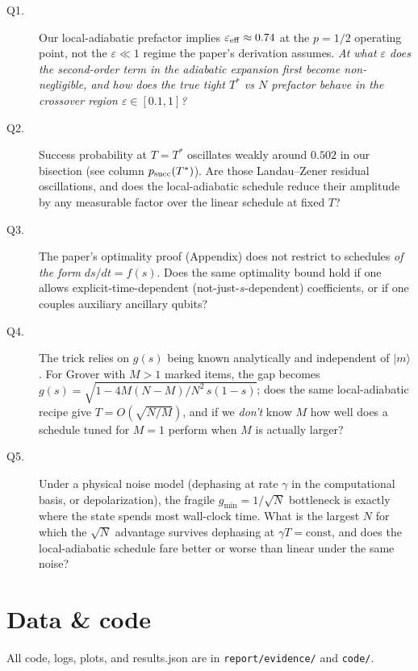 \documentclass[11pt]{article}
\begin{document}
\begin{description}
\item[Q1.] Our local-adiabatic prefactor implies
      $\varepsilon_{\rm eff}\approx 0.74$ at the $p=1/2$ operating point,
      not the $\varepsilon\ll 1$ regime the paper's derivation assumes.
      \emph{At what $\varepsilon$ does the second-order term in the adiabatic
      expansion first become non-negligible, and how does the true tight $T^*$
      vs $N$ prefactor behave in the crossover region $\varepsilon\in[0.1,1]$?}
\item[Q2.] Success probability at $T=T^*$ oscillates weakly around $0.502$ in
      our bisection (see column $p_{\rm succ}(T^{\ast})$). Are those Landau--Zener
      residual oscillations, and does the local-adiabatic schedule reduce their
      amplitude by any measurable factor over the linear schedule at fixed $T$?
\item[Q3.] The paper's optimality proof (Appendix) does not restrict to schedules
      \emph{of the form} $ds/dt=f(s)$. Does the same optimality bound hold if
      one allows explicit-time-dependent (not-just-$s$-dependent) coefficients,
      or if one couples auxiliary ancillary qubits?
\item[Q4.] The trick relies on $g(s)$ being known analytically and independent
      of $|m\rangle$. For Grover with $M>1$ marked items, the gap becomes
      $g(s)=\sqrt{1-4M(N-M)/N^2\,s(1-s)}$; does the same local-adiabatic
      recipe give $T=O(\sqrt{N/M})$, and if we \emph{don't} know $M$ how well
      does a schedule tuned for $M=1$ perform when $M$ is actually larger?
\item[Q5.] Under a physical noise model (dephasing at rate $\gamma$ in
      the computational basis, or depolarization), the fragile $g_{\min}=1/\sqrt N$
      bottleneck is exactly where the state spends most wall-clock time.
      What is the largest $N$ for which the $\sqrt N$ advantage survives
      dephasing at $\gamma T=\mathrm{const}$, and does the local-adiabatic
      schedule fare better or worse than linear under the same noise?
\end{description}

\section*{Data \& code}
All code, logs, plots, and results.json are in \texttt{report/evidence/} and
\texttt{code/}.
\end{document}
